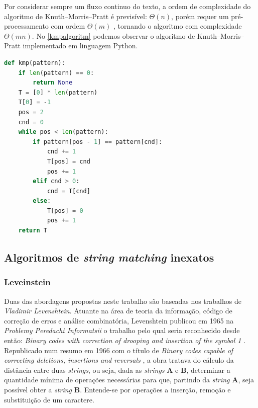 Por considerar sempre um fluxo continuo do texto, a ordem de complexidade do algoritmo de Knuth–Morris–Pratt é previsível: $\Theta(n)$, porém requer um pré-processamento com ordem $\Theta(m)$ \cite{hume1991fast}, tornando o algoritmo com complexidade $\Theta(mn)$.
No \autoref{kmpalgoritm} podemos observar o algoritmo de Knuth–Morris–Pratt implementado em linguagem Python.

\begin{lstlisting}[language=Python,label=kmpalgoritm,caption={Knuth–Morris–Pratt (KMP)}]
def kmp(pattern):
    if len(pattern) == 0:
        return None
    T = [0] * len(pattern)
    T[0] = -1
    pos = 2
    cnd = 0
    while pos < len(pattern):
        if pattern[pos - 1] == pattern[cnd]:
            cnd += 1
            T[pos] = cnd
            pos += 1
        elif cnd > 0:
            cnd = T[cnd]
        else:
            T[pos] = 0
            pos += 1
    return T
\end{lstlisting}



\subsection{Algoritmos de \textit{string matching} inexatos} %

\subsubsection*{Leveinstein} %
\label{sec:leveinstein}

Duas das abordagens propostas neste trabalho são baseadas nos trabalhos de \textit{Vladimir Levenshtein}. Atuante na área de teoria da informação, código de correção de erros e análise combinatória, Levenshtein publicou em 1965 na \textit{Problemy Peredachi Informatsii} o trabalho pelo qual seria reconhecido desde então: \textit{Binary codes with correction of drooping and insertion of the symbol 1} \cite{levenshtein1965}. Republicado num resumo em 1966 com o título de \textit{Binary codes capable of correcting deletions, insertions and reversals} \cite{levenshtein1966}, a obra tratava do cálculo da distância entre duas \textit{strings}, ou seja, dada as \textit{strings} \textbf{A} e \textbf{B}, determinar a quantidade mínima de operações necessárias para que, partindo da \textit{string} \textbf{A}, seja possível obter a \textit{string} \textbf{B}. Entende-se por operações a inserção, remoção e substituição de um caractere.

